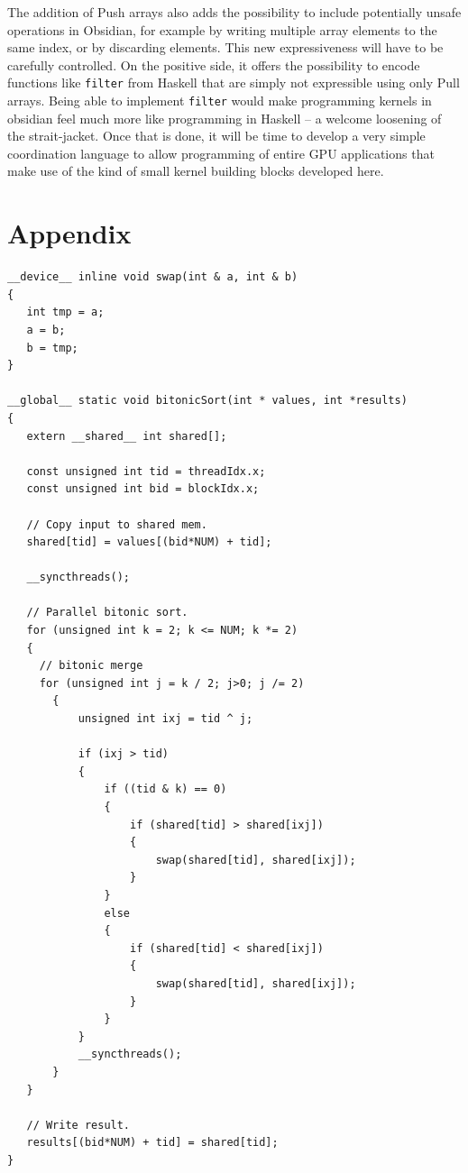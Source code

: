 \documentclass[]{sigplanconf}
\begin{document}
The addition of Push arrays also adds the possibility to include potentially 
unsafe operations in Obsidian, for example by writing multiple array elements to the same index, or by discarding elements.
This new expressiveness will have to be carefully controlled. On the positive side, it offers the possibility to encode functions like {\tt filter} from Haskell
that
are simply not expressible using only Pull arrays. Being able to implement {\tt filter} would make programming kernels in obsidian feel much more like programming in Haskell -- a welcome loosening of the strait-jacket.
Once that is done, it will be time to develop a very simple coordination language to allow programming of entire GPU applications that make use of
the kind of small kernel building blocks developed here.




\appendix
\section{Appendix}
\begin{codesize}
\begin{verbatim}
__device__ inline void swap(int & a, int & b)
{
   int tmp = a;
   a = b;
   b = tmp;
}

__global__ static void bitonicSort(int * values, int *results)
{
   extern __shared__ int shared[];

   const unsigned int tid = threadIdx.x;
   const unsigned int bid = blockIdx.x;

   // Copy input to shared mem.
   shared[tid] = values[(bid*NUM) + tid];

   __syncthreads();

   // Parallel bitonic sort.
   for (unsigned int k = 2; k <= NUM; k *= 2)
   { 
     // bitonic merge
     for (unsigned int j = k / 2; j>0; j /= 2)
       {
           unsigned int ixj = tid ^ j;

           if (ixj > tid)
           {
               if ((tid & k) == 0)
               {
                   if (shared[tid] > shared[ixj])
                   {
                       swap(shared[tid], shared[ixj]);
                   }
               }
               else
               {
                   if (shared[tid] < shared[ixj])
                   {
                       swap(shared[tid], shared[ixj]);
                   }
               }
           }
           __syncthreads();
       }
   }

   // Write result.
   results[(bid*NUM) + tid] = shared[tid];
}
\end{verbatim}
\end{codesize}
\end{document}
